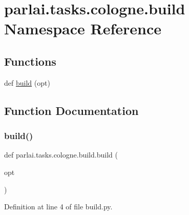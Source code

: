 \hypertarget{namespaceparlai_1_1tasks_1_1cologne_1_1build}{}\section{parlai.\+tasks.\+cologne.\+build Namespace Reference}
\label{namespaceparlai_1_1tasks_1_1cologne_1_1build}
\subsection*{Functions}
\begin{DoxyCompactItemize}
\item 
def \hyperlink{namespaceparlai_1_1tasks_1_1cologne_1_1build_a7aa62cb182d58231bd6f495e4054b6c1}{build} (opt)
\end{DoxyCompactItemize}


\subsection{Function Documentation}
\mbox{\label{namespaceparlai_1_1tasks_1_1cologne_1_1build_a7aa62cb182d58231bd6f495e4054b6c1}} 
\subsubsection{\texorpdfstring{build()}{build()}}
{\footnotesize\ttfamily def parlai.\+tasks.\+cologne.\+build.\+build (\begin{DoxyParamCaption}\item[{}]{opt }\end{DoxyParamCaption})}



Definition at line 4 of file build.\+py.



